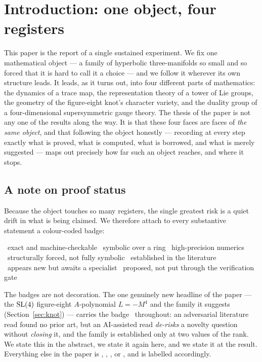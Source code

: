 \section{Introduction: one object, four registers}
\label{sec:intro}

This paper is the report of a single sustained experiment. We fix one mathematical
object --- a family of hyperbolic three-manifolds so small and so forced that it is
hard to call it a choice --- and we follow it wherever its own structure leads. It
leads, as it turns out, into four different parts of mathematics: the dynamics of a
trace map, the representation theory of a tower of Lie groups, the geometry of the
figure-eight knot's character variety, and the duality group of a four-dimensional
supersymmetric gauge theory. The thesis of the paper is not any one of the results
along the way. It is that these four faces are faces of \emph{the same object}, and
that following the object honestly --- recording at every step exactly what is proved,
what is computed, what is borrowed, and what is merely suggested --- maps out precisely
how far such an object reaches, and where it stops.

\subsection*{A note on proof status} Because the object touches so many registers, the
single greatest risk is a quiet drift in what is being claimed. We therefore attach to
every substantive statement a colour-coded badge:
\begin{center}\small
\sProved\ exact and machine-checkable\quad
\sExact\ symbolic over a ring\quad
\sNum\ high-precision numerics\\[2pt]
\sStruct\ structurally forced, not fully symbolic\quad
\sKnown\ established in the literature\\[2pt]
\sGated\ appears new but awaits a specialist\quad
\sPost\ proposed, not put through the verification gate
\end{center}
The badges are not decoration. The one genuinely new headline of the paper --- the
$\mathrm{SL}(4)$ figure-eight $A$-polynomial $L=-M^4$ and the family it suggests
(Section~\ref{sec:knot}) --- carries the badge \sGated\ throughout: an adversarial
literature read found no prior art, but an AI-assisted read \emph{de-risks} a novelty
question without \emph{closing} it, and the family is established only at two values of
the rank. We state this in the abstract, we state it again here, and we state it at the
result. Everything else in the paper is \sProved, \sExact, \sNum, or \sKnown, and is
labelled accordingly.

